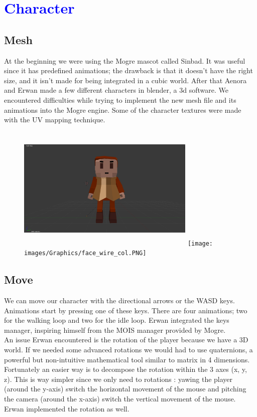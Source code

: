 \documentclass[article]{report} %
\begin{document}
		\chapter{\textcolor{blue}{Character}}
			\section{Mesh}
				At the beginning we were using the \ac{Mogre} mascot called Sinbad. It was useful since it has predefined animations; the drawback is that it doesn't have the right size, and it isn't made for being integrated in a cubic world. After that Aenora and Erwan made a few different characters in blender, a 3d software. We encountered difficulties while trying to implement the new mesh file and its animations into the \ac{Mogre} engine. Some of the character textures were made with the UV mapping technique.
				\begin{figure}[h]
					\includegraphics[width=8.5cm,   height=6cm]{images/Graphics/face_col.PNG}
					\texttt{[image: images/Graphics/face\_wire\_col.PNG]}
				\end{figure}
			\section{Move}
				We can move our character with the directional arrows or the WASD keys. Animations start by pressing one of these keys. There are four animations; two for the walking loop and two for the idle loop. Erwan integrated the keys manager, inspiring himself from the MOIS manager provided by \ac{Mogre}.\\

An issue Erwan encountered is the rotation of the player because we have a 3D world. If we needed some advanced rotations we would had to use quaternions, a powerful but non-intuitive mathematical tool similar to matrix in 4 dimensions. Fortunately an easier way is to decompose the rotation within the 3 axes (x, y, z). This is way simpler since we only need to rotations : yawing the player (around the y-axis) switch the horizontal movement of the mouse and pitching the camera (around the x-axis) switch the vertical movement of the mouse. Erwan implemented the rotation as well.
\end{document}
